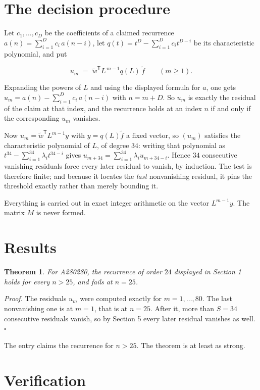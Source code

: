 \documentclass[11pt]{article}
\newtheorem{theorem}{Theorem}
\theoremstyle{definition}
\begin{document}
\section{The decision procedure}

Let $c_1,\dots,c_D$ be the coefficients of a claimed recurrence $a(n) = \sum_{i=1}^{D} c_i\,a(n-i)$, let $q(t) = t^{D} - \sum_{i=1}^{D} c_i t^{D-i}$ be its characteristic polynomial, and put

\[u_m \;=\; \tilde w^{\mathsf T} L^{\,m-1} q(L)\,\tilde f \qquad (m \ge 1).\]

Expanding the powers of $L$ and using the displayed formula for $a$, one gets $u_m = a(n) - \sum_{i=1}^{D} c_i\,a(n-i)$ with $n = m + D$. So $u_m$ is exactly the residual of the claim at that index, and the recurrence holds at an index $n$ if and only if the corresponding $u_m$ vanishes.

Now $u_m = \tilde w^{\mathsf T} L^{m-1} y$ with $y = q(L)\tilde f$ a fixed vector, so $(u_m)$ satisfies the characteristic polynomial of $L$, of degree $34$: writing that polynomial as $t^{34} - \sum_{i=1}^{34} \lambda_i t^{34-i}$ gives $u_{m+34} = \sum_{i=1}^{34} \lambda_i u_{m+34-i}$. Hence $34$ consecutive vanishing residuals force every later residual to vanish, by induction. The test is therefore finite; and because it locates the {\itshape last} nonvanishing residual, it pins the threshold exactly rather than merely bounding it.

Everything is carried out in exact integer arithmetic on the vector $L^{m-1}y$. The matrix $M$ is never formed.

\section{Results}

\begin{theorem} For A280280, the recurrence of order $24$ displayed in Section 1 holds for every $n > 25$, and fails at $n = 25$.\end{theorem}

{\itshape Proof.} The residuals $u_m$ were computed exactly for $m = 1,\dots,80$. The last nonvanishing one is at $m = 1$, that is at $n = 25$. After it, more than $S = 34$ consecutive residuals vanish, so by Section 5 every later residual vanishes as well. $\square$

The entry claims the recurrence for $n > 25$. The theorem is at least as strong.

\section{Verification}
\end{document}
